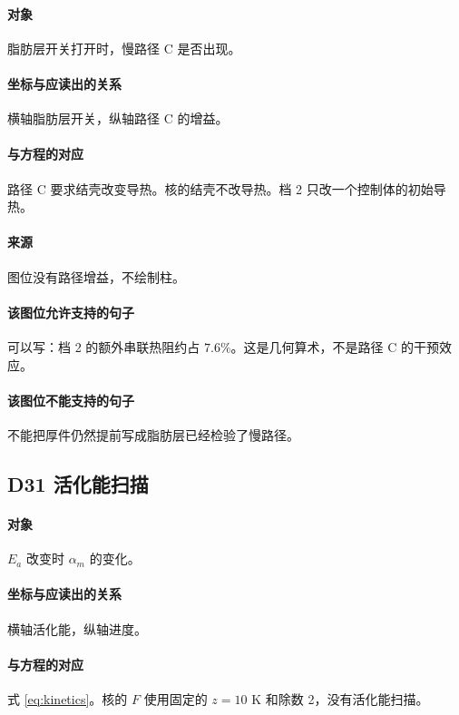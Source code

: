 \paragraph{对象}
脂肪层开关打开时，慢路径 C 是否出现。

\paragraph{坐标与应读出的关系}
横轴脂肪层开关，纵轴路径 C 的增益。

\paragraph{与方程的对应}
路径 C 要求结壳改变导热。核的结壳不改导热。档 2 只改一个控制体的初始导热。

\paragraph{来源}
图位没有路径增益，不绘制柱。

\paragraph{该图位允许支持的句子}
可以写：档 2 的额外串联热阻约占 $7.6\%$。这是几何算术，不是路径 C 的干预效应。

\paragraph{该图位不能支持的句子}
不能把厚件仍然提前写成脂肪层已经检验了慢路径。

\subsection{D31 活化能扫描}
\paragraph{对象}
$E_a$ 改变时 $\alpha_m$ 的变化。

\paragraph{坐标与应读出的关系}
横轴活化能，纵轴进度。

\paragraph{与方程的对应}
式 \eqref{eq:kinetics}。核的 $F$ 使用固定的 $z=10$ K 和除数 2，没有活化能扫描。

